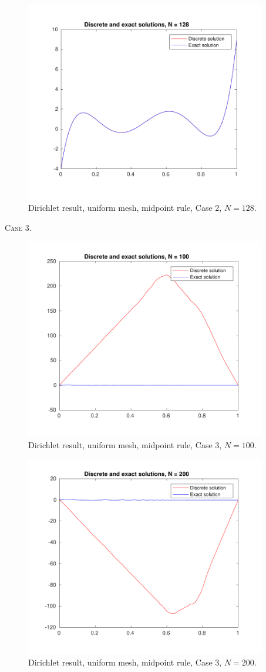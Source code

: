 \documentclass[a4paper]{article}
\numberwithin{equation}{section}
\begin{document}
\begin{figure}[H]
\centering\includegraphics[width=10.5cm]{fig_dirichlet_result_uniform_midpoint_N128_C2}
\caption{Dirichlet result, uniform mesh, midpoint rule, Case 2, $N=128$.}
\end{figure}
\newpage
\textsc{Case 3.}
\begin{figure}[H]
\centering\includegraphics[width=10.5cm]{fig_dirichlet_result_uniform_midpoint_N100_C3}
\caption{Dirichlet result, uniform mesh, midpoint rule, Case 3, $N=100$.}
\end{figure}
\begin{figure}[H]
\centering\includegraphics[width=10.5cm]{fig_dirichlet_result_uniform_midpoint_N200_C3}
\caption{Dirichlet result, uniform mesh, midpoint rule, Case 3, $N=200$.}
\end{figure}
\end{document}
